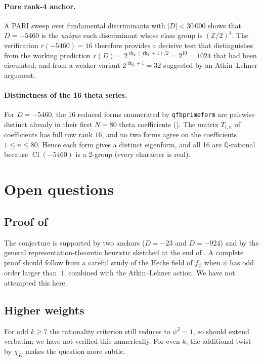 \documentclass[11pt]{amsart}
\theoremstyle{definition}
\theoremstyle{remark}
\DeclareMathOperator{\Cl}{Cl}
\DeclareMathOperator{\rk}{rk}
\newcommand{\Q}{\mathbb{Q}}
\newcommand{\Z}{\mathbb{Z}}
\newcommand{\chiK}{\chi_K}
\begin{document}
\paragraph{Pure rank-4 anchor.}
A PARI sweep over fundamental discriminants with \(|D| < 30\,000\)
shows that \(D = -5460\) is the \emph{unique} such discriminant whose
class group is \((\Z/2)^4\). The verification \(r(-5460) = 16\)
therefore provides a decisive test that distinguishes 
from the working prediction
\(r(D) = 2^{\rk_2(\rk_2+1)/2} = 2^{10} = 1024\) that had been
circulated; and from a weaker variant
\(2^{\rk_2 + 1} = 32\) suggested by an Atkin--Lehner argument.

\paragraph{Distinctness of the 16 theta series.}
For \(D = -5460\), the 16 reduced forms enumerated by
\texttt{qfbprimeform} are pairwise distinct already in their first
\(N = 80\) theta coefficients (). The matrix
\(T_{i,n}\) of coefficients has full row rank \(16\), and no two
forms agree on the coefficients \(1 \le n \le 80\). Hence each form
gives a distinct eigenform, and all 16 are \(\Q\)-rational because
\(\Cl(-5460)\) is a 2-group (every character is real).

\section{Open questions}\label{sec:open}

\subsection*{Proof of }
The conjecture is supported by two anchors (\(D=-23\) and \(D=-924\))
and by the general representation-theoretic heuristic sketched at the
end of . A complete proof should follow from a careful
study of the Hecke field of \(f_\psi\) when \(\psi\) has odd order
larger than~\(1\), combined with the Atkin--Lehner action. We have not
attempted this here.

\subsection*{Higher weights}
For odd \(k \ge 7\) the rationality criterion still reduces to
\(\psi^2 = 1\), so  should extend verbatim; we have not
verified this numerically. For even \(k\), the additional twist by
\(\chiK\) makes the question more subtle.
\end{document}
